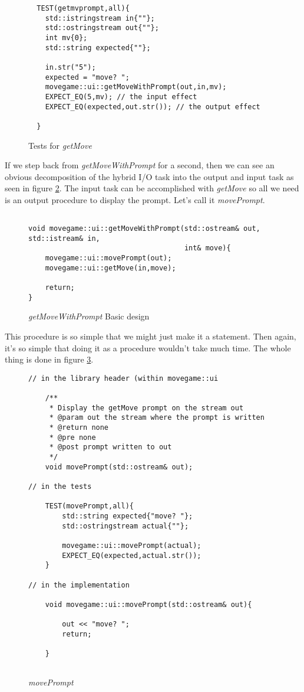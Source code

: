\documentclass[nobib]{tufte-handout}
\begin{document}
\begin{figure}[!htbp]
\begin{lstlisting}
  TEST(getmvprompt,all){
    std::istringstream in{""};
    std::ostringstream out{""};
    int mv{0};
    std::string expected{""};

    in.str("5");
    expected = "move? ";
    movegame::ui::getMoveWithPrompt(out,in,mv);
    EXPECT_EQ(5,mv); // the input effect
    EXPECT_EQ(expected,out.str()); // the output effect
    
  }
\end{lstlisting}
\caption{Tests for \textit{getMove}}
\label{fig:getPrmt-tests}
\end{figure}

If we step back from \textit{getMoveWithPrompt} for a second, then we can see an obvious decomposition of the hybrid I/O task into the output and input task as seen in figure \ref{fig:getPrmt-basic}.  The input task can be accomplished with \textit{getMove} so all we need is an output procedure to display the prompt.  Let's call it \textit{movePrompt}. 

\begin{figure}[!htbp]
\begin{lstlisting}

void movegame::ui::getMoveWithPrompt(std::ostream& out, std::istream& in,
								     int& move){
	movegame::ui::movePrompt(out);
	movegame::ui::getMove(in,move);

	return;
}
\end{lstlisting}
\caption{\textit{getMoveWithPrompt} Basic design}
\label{fig:getPrmt-basic}
\end{figure}


This procedure is so simple that we might just make it a statement. Then again, it's so simple that doing it as a procedure wouldn't take much time. The whole thing is done in figure \ref{fig:mvprmt}. 

\begin{figure}[!htbp]
\begin{lstlisting}
// in the library header (within movegame::ui

    /**
     * Display the getMove prompt on the stream out
     * @param out the stream where the prompt is written
     * @return none
     * @pre none
     * @post prompt written to out
     */
    void movePrompt(std::ostream& out);

// in the tests
 	
 	TEST(movePrompt,all){
    	std::string expected{"move? "};
    	std::ostringstream actual{""};

	    movegame::ui::movePrompt(actual);
  	    EXPECT_EQ(expected,actual.str());
  	}

// in the implementation

	void movegame::ui::movePrompt(std::ostream& out){
		
		out << "move? ";
		return;
		
	}
	
\end{lstlisting}
\caption{\textit{movePrompt}}
\label{fig:mvprmt}
\end{figure}
\end{document}

